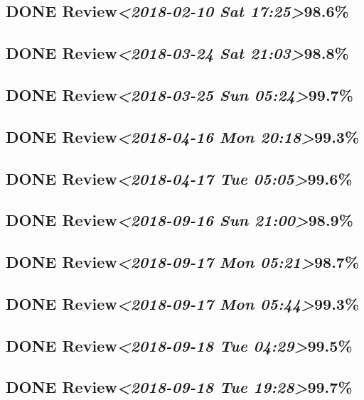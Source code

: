 \documentclass[11pt]{ctexart}
\begin{document}
\subsection{{\bfseries\sffamily DONE} Review\textit{<2018-02-10 Sat 17:25>}98.6\%}
\label{sec:orgd3b11d4}
\subsection{{\bfseries\sffamily DONE} Review\textit{<2018-03-24 Sat 21:03>}98.8\%}
\label{sec:org43d0c38}
\subsection{{\bfseries\sffamily DONE} Review\textit{<2018-03-25 Sun 05:24>}99.7\%}
\label{sec:org2082baa}
\subsection{{\bfseries\sffamily DONE} Review\textit{<2018-04-16 Mon 20:18>}99.3\%}
\label{sec:orga82e0fb}
\subsection{{\bfseries\sffamily DONE} Review\textit{<2018-04-17 Tue 05:05>}99.6\%}
\label{sec:org82c7db1}
\subsection{{\bfseries\sffamily DONE} Review\textit{<2018-09-16 Sun 21:00>}98.9\%}
\label{sec:orgc2955f9}
\subsection{{\bfseries\sffamily DONE} Review\textit{<2018-09-17 Mon 05:21>}98.7\%}
\label{sec:org204ca9a}
\subsection{{\bfseries\sffamily DONE} Review\textit{<2018-09-17 Mon 05:44>}99.3\%}
\label{sec:orgfdef142}
\subsection{{\bfseries\sffamily DONE} Review\textit{<2018-09-18 Tue 04:29>}99.5\%}
\label{sec:org6a423cf}
\subsection{{\bfseries\sffamily DONE} Review\textit{<2018-09-18 Tue 19:28>}99.7\%}
\label{sec:org7260bc1}
\end{document}
